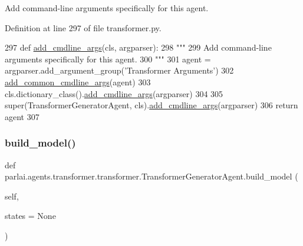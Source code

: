 \begin{DoxyVerb}Add command-line arguments specifically for this agent.
\end{DoxyVerb}
 

Definition at line 297 of file transformer.\+py.


\begin{DoxyCode}
297     \textcolor{keyword}{def }\hyperlink{namespaceparlai_1_1agents_1_1drqa_1_1config_a62fdd5554f1da6be0cba185271058320}{add\_cmdline\_args}(cls, argparser):
298         \textcolor{stringliteral}{"""}
299 \textcolor{stringliteral}{        Add command-line arguments specifically for this agent.}
300 \textcolor{stringliteral}{        """}
301         agent = argparser.add\_argument\_group(\textcolor{stringliteral}{'Transformer Arguments'})
302         \hyperlink{namespaceparlai_1_1agents_1_1transformer_1_1transformer_a916bc49d43dc0e244d24c47956c621ca}{add\_common\_cmdline\_args}(agent)
303         cls.dictionary\_class().\hyperlink{namespaceparlai_1_1agents_1_1drqa_1_1config_a62fdd5554f1da6be0cba185271058320}{add\_cmdline\_args}(argparser)
304 
305         super(TransformerGeneratorAgent, cls).\hyperlink{namespaceparlai_1_1agents_1_1drqa_1_1config_a62fdd5554f1da6be0cba185271058320}{add\_cmdline\_args}(argparser)
306         \textcolor{keywordflow}{return} agent
307 
\end{DoxyCode}
\mbox{\label{classparlai_1_1agents_1_1transformer_1_1transformer_1_1TransformerGeneratorAgent_a473f2a19d6bce412c4c9163c7beb9b09}} 
\subsubsection{\texorpdfstring{build\+\_\+model()}{build\_model()}}
{\footnotesize\ttfamily def parlai.\+agents.\+transformer.\+transformer.\+Transformer\+Generator\+Agent.\+build\+\_\+model (\begin{DoxyParamCaption}\item[{}]{self,  }\item[{}]{states = {\ttfamily None} }\end{DoxyParamCaption})}

